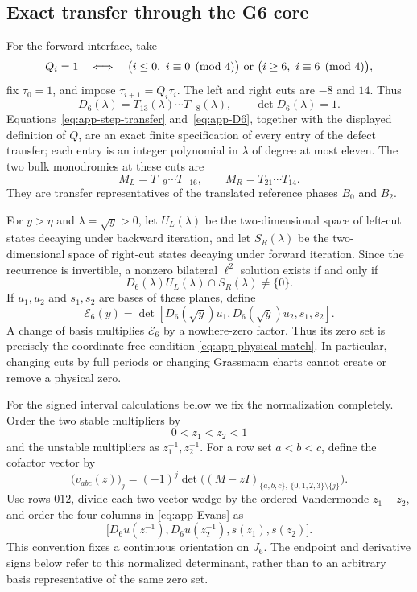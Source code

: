 \subsection{Exact transfer through the G6 core}
\label{appsubsec:g6-transfer}

For the forward interface, take
\[
 Q_i=1
 \quad\Longleftrightarrow\quad
 \bigl(i\leq0,\ i\equiv0\pmod4\bigr)
 \ \hbox{or}\
 \bigl(i\geq6,\ i\equiv6\pmod4\bigr),
\]
fix \(\tau_0=1\), and impose \(\tau_{i+1}=Q_i\tau_i\).  The left and
right cuts are \(-8\) and \(14\).  Thus
\begin{equation}
 D_6(\lambda)=T_{13}(\lambda)\cdots T_{-8}(\lambda),
 \qquad \det D_6(\lambda)=1.            \label{eq:app-D6}
\end{equation}
Equations~\eqref{eq:app-step-transfer} and~\eqref{eq:app-D6}, together with
the displayed definition of \(Q\), are an exact finite specification of
every entry of the defect transfer; each entry is an integer polynomial in
\(\lambda\) of degree at most eleven.  The two bulk monodromies at these
cuts are
\[
 M_L=T_{-9}\cdots T_{-16},\qquad
 M_R=T_{21}\cdots T_{14}.
\]
They are transfer representatives of the translated reference phases
\(B_0\) and \(B_2\).

For \(y>\eta\) and \(\lambda=\sqrt y>0\), let \(U_L(\lambda)\) be the
two-dimensional space of left-cut states decaying under backward iteration,
and let \(S_R(\lambda)\) be the two-dimensional space of right-cut states
decaying under forward iteration.  Since the recurrence is invertible, a
nonzero bilateral \(\ell^2\) solution exists if and only if
\begin{equation}
 D_6(\lambda)U_L(\lambda)\cap S_R(\lambda)\neq\{0\}.
                                                        \label{eq:app-physical-match}
\end{equation}
If \(u_1,u_2\) and \(s_1,s_2\) are bases of these planes, define
\begin{equation}
 \mathcal E_6(y)=
 \det[D_6(\sqrt y)u_1,D_6(\sqrt y)u_2,s_1,s_2].       \label{eq:app-Evans}
\end{equation}
A change of basis multiplies \(\mathcal E_6\) by a nowhere-zero factor.
Thus its zero set is precisely the coordinate-free condition
\eqref{eq:app-physical-match}.  In particular, changing cuts by full
periods or changing Grassmann charts cannot create or remove a physical
zero.

For the signed interval calculations below we fix the normalization
completely.  Order the two stable multipliers by
\[
0<z_1<z_2<1
\]
and the unstable multipliers as \(z_1^{-1},z_2^{-1}\).  For a row set
\(a<b<c\), define the cofactor vector by
\[
\bigl(v_{abc}(z)\bigr)_j
=(-1)^j\det\bigl((M-zI)_{\{a,b,c\},\,\{0,1,2,3\}\setminus\{j\}}\bigr).
\]
Use rows \(012\), divide each two-vector wedge by the ordered Vandermonde
\(z_1-z_2\), and order the four columns in
\eqref{eq:app-Evans} as
\[
\bigl[D_6u(z_1^{-1}),D_6u(z_2^{-1}),s(z_1),s(z_2)\bigr].
\]
This convention fixes a continuous orientation on \(J_6\).  The endpoint
and derivative signs below refer to this normalized determinant, rather than
to an arbitrary basis representative of the same zero set.


